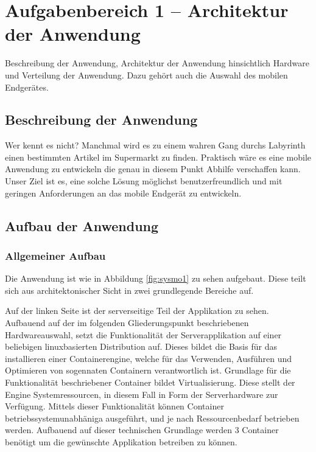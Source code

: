 \section{Aufgabenbereich 1 -- Architektur der Anwendung}
Beschreibung der Anwendung, Architektur der Anwendung hinsichtlich Hardware und Verteilung der Anwendung.
Dazu gehört auch die Auswahl des mobilen Endgerätes.

\subsection{Beschreibung der Anwendung}
Wer kennt es nicht? Manchmal wird es zu einem wahren Gang durchs Labyrinth einen bestimmten Artikel im Supermarkt zu finden.
Praktisch wäre es eine mobile Anwendung zu entwickeln die genau in diesem Punkt Abhilfe verschaffen kann.
Unser Ziel ist es, eine solche Lösung möglichst benutzerfreundlich und mit geringen Anforderungen an das mobile Endgerät zu entwickeln. 


\subsection{Aufbau der Anwendung}
\subsubsection{Allgemeiner Aufbau}
Die Anwendung ist wie in Abbildung \ref{fig:sysmo1} zu sehen aufgebaut. Diese teilt sich aus architektonischer Sicht in zwei grundlegende
Bereiche auf.

Auf der linken Seite ist der serverseitige Teil der Applikation zu sehen. Aufbauend auf der im folgenden Gliederungspunkt
beschriebenen Hardwareauswahl, setzt die Funktionalität der Serverapplikation auf einer beliebigen linuxbasierten Distribution auf. Dieses
bildet die Basis für das installieren einer Containerengine, welche für das Verwenden, Ausführen und Optimieren von sogennaten Containern 
verantwortlich ist.  
Grundlage für die Funktionalität beschriebener Container bildet Virtualisierung. Diese stellt der Engine Systemressourcen, in diesem Fall
in Form der Serverhardware zur Verfügung. Mittels dieser Funktionalität können Container betriebssystemunabhäniga ausgeführt, und je nach
Ressourcenbedarf betrieben werden. Aufbauend auf dieser technischen Grundlage werden 3 Container benötigt um die gewünschte Applikation 
betreiben zu können. 

